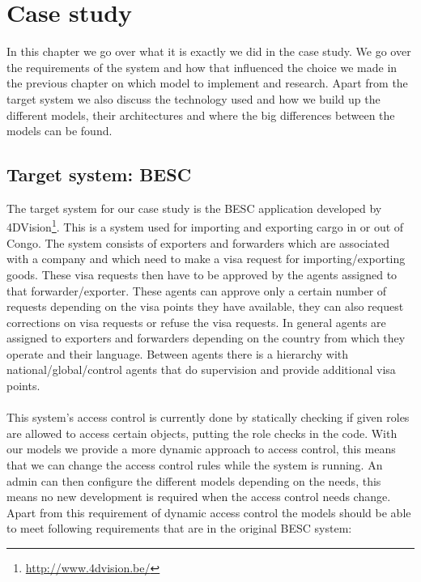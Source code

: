 \chapter{Case study}
\label{chapt:Case study}

In this chapter we go over what it is exactly we did in the case study.
We go over the requirements of the system and how that influenced the choice we made in the previous chapter on which model to implement and research.
Apart from the target system we also discuss the technology used and how we build up the different models, their architectures and where the big differences between the models can be found.

\section{Target system: BESC}
The target system for our case study  is the BESC application developed by 4DVision\footnote{\url{http://www.4dvision.be/}}. 
This is a system used for importing and exporting cargo in or out of Congo.
The system consists of exporters and forwarders which are associated with a company and which need to make a visa request for importing/exporting goods.
These visa requests then have to be approved by the agents assigned to that forwarder/exporter. 
These agents can approve only a certain number of requests depending on the visa points they have available, they can also request corrections on visa requests or refuse the visa requests.
In general agents are assigned to exporters and forwarders depending on the country from which they operate and their language.
Between agents there is a hierarchy with national/global/control agents that do supervision and provide additional visa points.
\\
\\
This system's access control is currently done by statically checking if given roles are allowed to access certain objects, putting the role checks in the code. 
With our models we provide a more dynamic approach to access control, this means that we can change the access control rules while the system is running.
An admin can then configure the different models depending on the needs, this means no new development is required when the access control needs change.
Apart from this requirement of dynamic access control the models should be able to meet following requirements that are in the original BESC system:
\\
